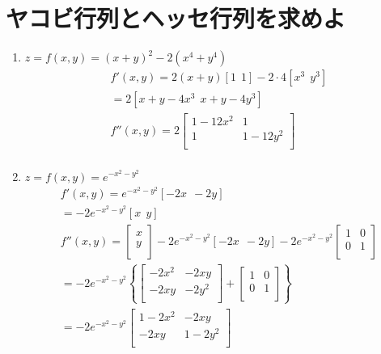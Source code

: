\documentclass[a4paper,10pt]{jarticle}
\begin{document}
\section{ヤコビ行列とヘッセ行列を求めよ}
\begin{enumerate}
\item $z = f(x,y) = (x+y)^2-2(x^4+y^4)$\begin{gather*}
	f'(x,y) = 2(x+y) [1 \ \ 1]-2 \cdot 4 [x^3 \ \ y^3] \\
	=2[x+y-4x^3 \ \ x+y-4y^3] \\
	f''(x,y) = 2
	\left[    \begin{array}{cc}
		1-12x^2 & 1 \\
		1 &  1-12y^2\\
	\end{array}  \right] \\
\end{gather*}
\item$ z = f(x,y) = e^{-x^2-y^2}$\begin{gather*}
	f'(x,y) = e^{-x^2-y^2} [-2x \ \ -2y] \\
	= -2e^{-x^2-y^2} [x \ \ y] \\
	f''(x,y) = 
	\left[    \begin{array}{c}
		x \\
		y \\
	\end{array}  \right] 
	-2e^{-x^2-y^2} [-2x \ \ -2y] -2e^{-x^2-y^2}
	\left[    \begin{array}{cc}
		1 & 0 \\
		0 &  1\\
	\end{array}  \right] \\
	= -2e^{-x^2-y^2} \left\{
	\left[    \begin{array}{cc}
		-2x^2 & -2xy \\
		-2xy &  -2y^2\\
	\end{array}  \right] +
	\left[    \begin{array}{cc}
		1 & 0 \\
		0 &  1\\
	\end{array}  \right] 
	\right\} \\
	= -2e^{-x^2-y^2}
	\left[    \begin{array}{cc}
		1-2x^2 & -2xy \\
		-2xy &  1-2y^2\\
	\end{array} \right] 
\end{gather*}
\end{enumerate}
\end{document}
